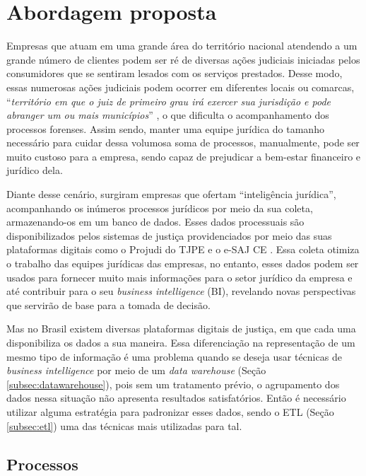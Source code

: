 \section{Abordagem proposta}

Empresas que atuam em uma grande área do território nacional atendendo a um grande número de clientes podem ser ré de diversas ações judiciais iniciadas pelos consumidores que se sentiram lesados com os serviços prestados. Desse modo, essas numerosas ações judiciais podem ocorrer em diferentes locais ou comarcas, \enquote{\textit{território em que o juiz de primeiro grau irá exercer sua jurisdição e pode abranger um ou mais municípios}} \cite{cnj:comarca}, o que dificulta o acompanhamento dos processos forenses. Assim sendo, manter uma equipe jurídica do tamanho necessário para cuidar dessa volumosa soma de processos, manualmente, pode ser muito custoso para a empresa, sendo capaz de prejudicar a bem-estar financeiro e jurídico dela.

Diante desse cenário, surgiram empresas que ofertam \enquote{inteligência jurídica}, acompanhando os inúmeros processos jurídicos por meio da sua coleta, armazenando-os em um banco de dados. Esses dados processuais são disponibilizados pelos sistemas de justiça providenciados por meio das suas plataformas digitais como o Projudi do TJPE \cite{tjpe} e o e-SAJ CE \cite{esajce}. Essa coleta otimiza o trabalho das equipes jurídicas das empresas, no entanto, esses dados podem ser usados para fornecer muito mais informações para o setor jurídico da empresa e até contribuir para o seu \textit{business intelligence} (BI), revelando novas perspectivas que servirão de base para a tomada de decisão.

Mas no Brasil existem diversas plataformas digitais de justiça, em que cada uma disponibiliza os dados a sua maneira. Essa diferenciação na representação de um mesmo tipo de informação é uma problema quando se deseja usar técnicas de \textit{business intelligence} por meio de um \textit{data warehouse} (Seção \ref{subsec:datawarehouse}), pois sem um tratamento prévio, o agrupamento dos dados nessa situação não apresenta resultados satisfatórios. Então é necessário utilizar alguma estratégia para padronizar esses dados, sendo o ETL (Seção \ref{subsec:etl}) uma das técnicas mais utilizadas para tal.

\subsection{Processos}
\label{processos}


